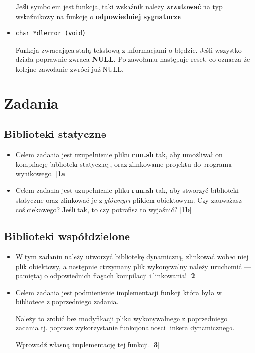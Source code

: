 \documentclass[12pt]{article}
\begin{document}
\begin{itemize}
  Jeśli symbolem jest funkcja, taki wskaźnik należy \textbf{zrzutować} na typ
  wskaźnikowy na funkcję o \textbf{odpowiedniej sygnaturze}

\item
\begin{lstlisting}
char *dlerror (void)
\end{lstlisting}
  Funkcja zwracająca stałą tekstową z informacjami o błędzie. Jeśli wszystko
  działa poprawnie zwraca \textbf{NULL}. Po zawołaniu następuje reset, co
  oznacza że kolejne zawołanie zwróci już NULL.
\end{itemize}

\section{Zadania}
\subsection{Biblioteki statyczne}
\begin{itemize}
\item Celem zadania jest uzupełnienie pliku \textbf{run.sh} tak, aby umożliwał
  on kompilację biblioteki statycznej, oraz zlinkowanie projektu do programu
  wynikowego. [\textbf{1a}]
\item Celem zadania jest uzupełnienie pliku \textbf{run.sh} tak, aby stworzyć
  biblioteki statyczne oraz zlinkować je z \textit{głównym} plikiem obiektowym.
  Czy zauważasz coś ciekawego? Jeśli tak, to czy potrafisz to wyjaśnić?
  [\textbf{1b}]
\end{itemize}
\subsection{Biblioteki współdzielone}
\begin{itemize}
\item W tym zadaniu należy utworzyć bibliotekę dynamiczną, zlinkować wobec niej
  plik obiektowy, a następnie otrzymany plik wykonywalny należy uruchomić ---
  pamiętaj o odpowiednich flagach kompilacji i linkowania! [\textbf{2}]
\item Celem zadania jest podmienienie implementacji funkcji która była w
  bibliotece z poprzedniego zadania.

  Należy to zrobić bez modyfikacji pliku wykonywalnego z poprzedniego
  zadania tj. poprzez wykorzystanie funkcjonalności linkera dynamicznego.

  Wprowadź własną implementację tej funkcji. [\textbf{3}]
\end{itemize}
\end{document}
